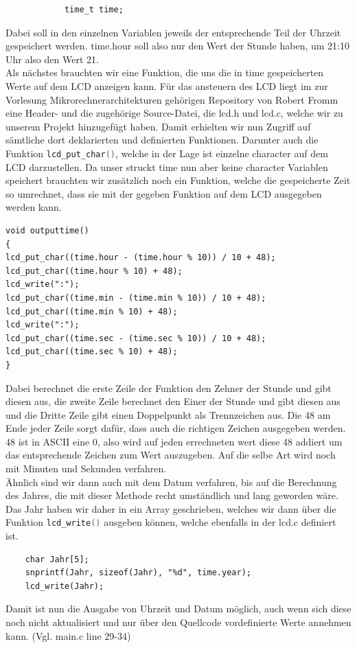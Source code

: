 \documentclass[openright,twoside,11pt,a4paper]{scrartcl}
\begin{document}
\begin{flushleft}
\begin{lstlisting}
			time_t time;
		\end{lstlisting}
		Dabei soll in den einzelnen Variablen jeweils der entsprechende Teil der Uhrzeit gespeichert werden. time.hour soll also nur den Wert der Stunde haben, um 21:10 Uhr also den Wert 21.\\
		Als nächstes brauchten wir eine Funktion, die uns die in time gespeicherten Werte auf dem LCD anzeigen kann. Für das ansteuern des LCD liegt im zur Vorlesung Mikrorechnerarchitekturen gehörigen Repository von Robert Fromm eine Header- und die zugehörige Source-Datei, die lcd.h und lcd.c, welche wir zu unserem Projekt hinzugefügt haben. Damit erhielten wir nun Zugriff auf sämtliche dort deklarierten und definierten Funktionen. Darunter auch die Funktion \lstinline[language=C++]|lcd_put_char()|, welche in der Lage ist einzelne  character auf dem LCD darzustellen. Da unser struckt time nun aber keine character Variablen speichert brauchten wir zusätzlich noch ein Funktion, welche die gespeicherte Zeit so umrechnet, dass sie mit der gegeben Funktion auf dem LCD ausgegeben werden kann. 
		\begin{lstlisting}
void outputtime()
{
lcd_put_char((time.hour - (time.hour % 10)) / 10 + 48);
lcd_put_char((time.hour % 10) + 48);
lcd_write(":");
lcd_put_char((time.min - (time.min % 10)) / 10 + 48);
lcd_put_char((time.min % 10) + 48);
lcd_write(":");
lcd_put_char((time.sec - (time.sec % 10)) / 10 + 48);
lcd_put_char((time.sec % 10) + 48);
}
		\end{lstlisting}
		Dabei berechnet die erste Zeile der Funktion den Zehner der Stunde und gibt diesen aus, die zweite Zeile berechnet den Einer der Stunde und gibt diesen aus und die Dritte Zeile gibt einen Doppelpunkt als Trennzeichen aus. Die 48 am Ende jeder Zeile sorgt dafür, dass auch die richtigen Zeichen ausgegeben werden. 48 ist in ASCII eine 0, also wird auf jeden errechneten wert diese 48 addiert um das entsprechende Zeichen zum Wert auszugeben. Auf die selbe Art wird noch mit Minuten und Sekunden verfahren.\\
		Ähnlich sind wir dann auch mit dem Datum verfahren, bis auf die Berechnung des Jahres, die mit dieser Methode recht umständlich und lang geworden wäre. Das Jahr haben wir daher in ein Array geschrieben, welches wir dann über die Funktion \lstinline[language=c++]|lcd_write()| ausgeben können, welche ebenfalls in der lcd.c definiert ist. \\
		\begin{lstlisting}
 	char Jahr[5];
	snprintf(Jahr, sizeof(Jahr), "%d", time.year);
	lcd_write(Jahr);
		\end{lstlisting}
		Damit ist nun die Ausgabe von Uhrzeit und Datum möglich, auch wenn sich diese noch nicht aktualisiert und nur über den Quellcode vordefinierte Werte annehmen kann. (Vgl. main.c line 29-34)
		

\end{flushleft}
\end{document}
